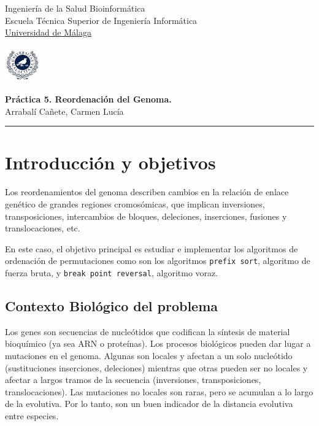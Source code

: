 \documentclass[11pt,letterpaper]{article}
\begin{document}

\usetikzlibrary{positioning}
\pagestyle{plain}
\begin{flushleft}
Ingeniería de la Salud \hfill Bioinformática\\
Escuela Técnica Superior de Ingeniería Informática\\
\underline{Universidad de Málaga}
\end{flushleft}

\begin{flushright}\vspace{-5mm}
\includegraphics[height=1.5cm]{escudo.jpg}
\end{flushright}

\begin{center}\vspace{-1cm}
\textbf{\large Práctica 5. Reordenación del Genoma.}\\   %
Arrabalí Cañete, Carmen Lucía\\                         %
\end{center}
\rule{\linewidth}{0.1mm}


\section{Introducción y objetivos}
Los reordenamientos del genoma describen cambios en la relación de enlace genético de grandes regiones cromosómicas, que implican inversiones, transposiciones, intercambios de bloques, deleciones, inserciones, fusiones y translocaciones, etc.

En este caso, el objetivo principal es estudiar e implementar los algoritmos de ordenación de permutaciones como son los algoritmos \texttt{prefix sort}, algoritmo de fuerza bruta, y \texttt{break point reversal}, algoritmo voraz.

\subsection{Contexto Biológico del problema}
Los genes son secuencias de nucleótidos que codifican la síntesis de material bioquímico (ya sea ARN o proteínas).
Los procesos biológicos pueden dar lugar a mutaciones en el genoma. Algunas son locales y afectan a un solo nucleótido (sustituciones inserciones, deleciones) mientras que otras pueden ser no locales y afectar a largos tramos de la secuencia (inversiones, transposiciones, translocaciones). Las mutaciones no locales son raras, pero se acumulan a lo largo de la evolutiva. Por lo tanto, son un buen indicador de la distancia evolutiva entre especies.
\end{document}

